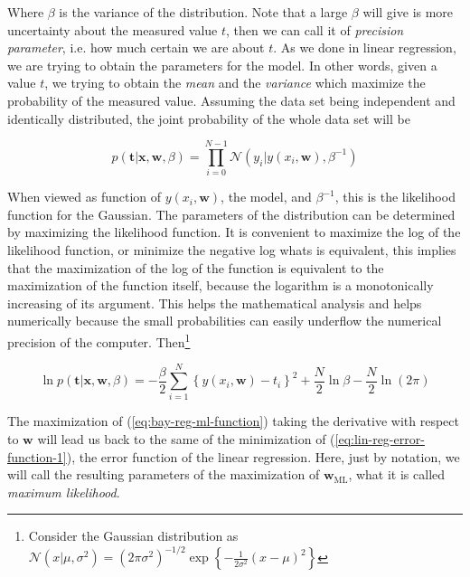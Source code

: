 \documentclass[11pt]{article} %
\begin{document}
Where $\beta$ is the variance of the distribution. Note that a large $\beta$ will give is more uncertainty about the measured value $t$, then we can call it of \textit{precision parameter}, i.e. how much certain we are about $t$. As we done in linear regression, we are trying to obtain the parameters for the model. In other words, given a value $t$, we trying to obtain the \textit{mean} and the \textit{variance} which maximize the probability of the measured value. Assuming the data set being independent and identically distributed, the joint probability of the whole data set will be

\begin{equation}
   p(\mathbf{t} | \mathbf{x}, \mathbf{w}, \beta)= \prod_{i=0}^{N-1} \mathcal{N}\left(y_i | y(x_i, \mathbf{w}), \beta^{-1}\right)
\end{equation}

When viewed as function of $y(x_i, \mathbf{w})$, the model, and $\beta^{-1}$, this is the likelihood function for the Gaussian. The parameters of the distribution can be determined by maximizing the likelihood function. It is convenient to maximize the log of the likelihood function, or minimize the negative log whats is equivalent, this implies that the maximization of the log of the function is equivalent to the maximization of the function itself, because the logarithm is a monotonically increasing of its argument. This helps the mathematical analysis and helps numerically because the small probabilities can easily underflow the numerical precision of the computer. Then\footnote[2]{Consider the Gaussian distribution as $\mathcal{N}\left(x | \mu, \sigma^{2}\right)=\left(2 \pi \sigma^{2}\right)^{-1 / 2} \exp \left\{-\frac{1}{2 \sigma^{2}}(x-\mu)^{2}\right\}$}

\begin{equation}
   \label{eq:bay-reg-ml-function}
   \ln p(\mathbf{t} | \mathbf{x}, \mathbf{w}, \beta)=-\frac{\beta}{2} \sum_{i=1}^{N}\left\{y\left(x_{i}, \mathbf{w}\right)-t_{i}\right\}^{2}+\frac{N}{2} \ln \beta-\frac{N}{2} \ln (2 \pi)
\end{equation}

The maximization of (\ref{eq:bay-reg-ml-function}) taking the derivative with respect to $\mathbf{w}$ will lead us back to 
the same of the minimization of (\ref{eq:lin-reg-error-function-1}), the error function of the linear regression. Here, just by notation, we will call the resulting parameters of the maximization of $\mathbf{w}_{\text{ML}}$, what it is called \textit{maximum likelihood}.
\end{document}
